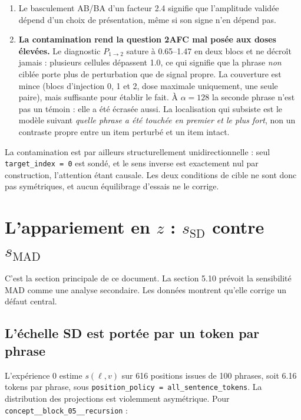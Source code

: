 \documentclass[11pt,a4paper]{article}
\newcommand{\ssd}{s_{\mathrm{SD}}}
\newcommand{\smad}{s_{\mathrm{MAD}}}
\newcommand{\code}[1]{\texttt{\small #1}}
\begin{document}
\begin{enumerate}
\item Le basculement AB/BA d'un facteur \num{2.4} signifie que l'amplitude validée
      dépend d'un choix de présentation, même si son signe n'en dépend pas.
\item \textbf{La contamination rend la question 2AFC mal posée aux doses élevées.} Le
      diagnostic $P_{1\rightarrow2}$ sature à \num{0.65}--\num{1.47} en deux blocs et ne
      décroît jamais : plusieurs cellules dépassent \num{1.0}, ce qui signifie que la
      phrase \emph{non} ciblée porte plus de perturbation que de signal propre. La
      couverture est mince (blocs d'injection 0, 1 et 2, dose maximale uniquement, une
      seule paire), mais suffisante pour établir le fait. À $\alpha = 128$ la seconde
      phrase n'est pas un témoin : elle a été écrasée aussi. La localisation qui subsiste
      est le modèle suivant \emph{quelle phrase a été touchée en premier et le plus
      fort}, non un contraste propre entre un item perturbé et un item intact.
\end{enumerate}

\noindent
La contamination est par ailleurs structurellement unidirectionnelle : seul
\code{target\_index = 0} est sondé, et le sens inverse est exactement nul par
construction, l'attention étant causale. Les deux conditions de cible ne sont donc pas
symétriques, et aucun équilibrage d'essais ne le corrige.

\section{L'appariement en \texorpdfstring{$z$}{z} : \texorpdfstring{$\ssd$}{s\_SD} contre \texorpdfstring{$\smad$}{s\_MAD}}
\label{sec:zmad}

C'est la section principale de ce document. La section 5.10 prévoit la sensibilité MAD
comme une analyse secondaire. Les données montrent qu'elle corrige un défaut central.

\subsection{L'échelle SD est portée par un token par phrase}

L'expérience 0 estime $s(\ell,v)$ sur \num{616} positions issues de \num{100} phrases,
soit \num{6.16} tokens par phrase, sous \code{position\_policy = all\_sentence\_tokens}.
La distribution des projections est violemment asymétrique. Pour
\code{concept\_\_block\_05\_\_recursion} :
\end{document}
